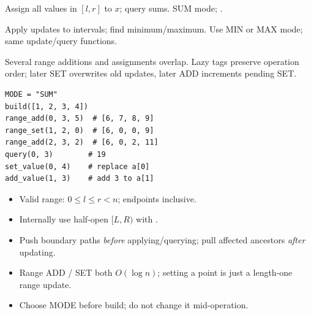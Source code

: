 \documentclass[9pt,a4paper]{extarticle}
\begin{document}
\begin{minipage}[t]{\textwidth}
\begin{minipage}[t]{0.475\linewidth}
{Assign all values in $[l,r]$ to $x$; query sums.}
{SUM mode; .}

{Apply updates to intervals; find minimum/maximum.}
{Use MIN or MAX mode; same update/query functions.}

{Several range additions and assignments overlap.}
{Lazy tags preserve operation order; later SET overwrites
old updates, later ADD increments pending SET.}


\begin{lstlisting}
MODE = "SUM"
build([1, 2, 3, 4])
range_add(0, 3, 5)  # [6, 7, 8, 9]
range_set(1, 2, 0)  # [6, 0, 0, 9]
range_add(2, 3, 2)  # [6, 0, 2, 11]
query(0, 3)        # 19
set_value(0, 4)    # replace a[0]
add_value(1, 3)    # add 3 to a[1]
\end{lstlisting}


\begin{itemize}[
  leftmargin=11pt,
  topsep=0pt,
  itemsep=2pt,
  parsep=0pt
]

\item Valid range: $0\le l\le r<n$;
endpoints inclusive.

\item Internally use half-open $[L,R)$
with .

\item Push boundary paths \emph{before}
applying/querying; pull affected ancestors
\emph{after} updating.

\item Range ADD / SET both $O(\log n)$;
setting a point is just a length-one range update.

\item Choose MODE before build;
do not change it mid-operation.

\end{itemize}

\end{minipage}%
\end{minipage}

\endgroup
\end{document}
